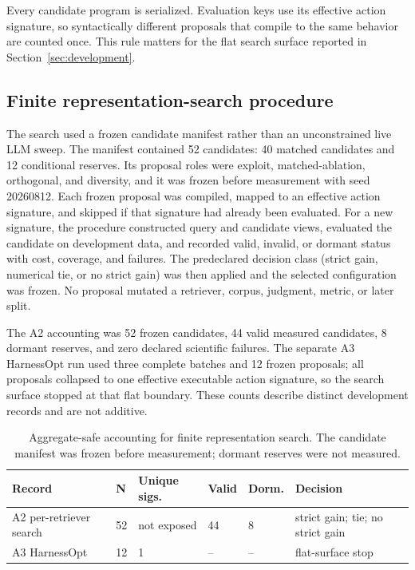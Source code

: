 \documentclass[final,5p,times,twocolumn]{elsarticle}
\newenvironment{widejournal}{\begin{table}[!t]}{\end{table}}
\newcommand{\journalTableFont}{\footnotesize}
\newenvironment{widejournal}{\begin{table}[!htbp]}{\end{table}}
\newcommand{\journalTableFont}{\footnotesize}
\begin{document}
Every candidate program is serialized. Evaluation keys use its effective
action signature, so syntactically different proposals that compile to the
same behavior are counted once. This rule matters for the flat search surface
reported in Section~\ref{sec:development}.

\subsection{Finite representation-search procedure}

The search used a frozen candidate manifest rather than an unconstrained live
LLM sweep. The manifest contained 52 candidates: 40 matched candidates and 12
conditional reserves. Its proposal roles were exploit, matched-ablation,
orthogonal, and diversity, and it was frozen before measurement with seed
20260812. Each frozen proposal was compiled, mapped to an effective action
signature, and skipped if that signature had already been evaluated. For a
new signature, the procedure constructed query and candidate views, evaluated
the candidate on development data, and recorded valid, invalid, or dormant
status with cost, coverage, and failures. The predeclared decision class
(strict gain, numerical tie, or no strict gain) was then applied and the
selected configuration was frozen. No proposal mutated a retriever, corpus,
judgment, metric, or later split.

The A2 accounting was 52 frozen candidates, 44 valid measured candidates, 8
dormant reserves, and zero declared scientific failures. The separate A3
HarnessOpt run used three complete batches and 12 frozen proposals; all
proposals collapsed to one effective executable action signature, so the
search surface stopped at that flat boundary. These counts describe distinct
development records and are not additive.

\begin{widejournal}
\caption{Aggregate-safe accounting for finite representation search. The
candidate manifest was frozen before measurement; dormant reserves were not
measured.}
\label{tab:search-accounting}
\centering
\journalTableFont
\scriptsize
\setlength{\tabcolsep}{2pt}
\sloppy
\begin{tabularx}{\textwidth}{@{}P{2.8cm}P{1.0cm}P{1.9cm}P{1.5cm}P{1.1cm}Y@{}}
\toprule
Record & N & Unique sigs. & Valid & Dorm. & Decision \\
\midrule
A2 per-retriever search & 52 & not exposed & 44 & 8 & strict gain; tie; no strict gain \\
A3 HarnessOpt & 12 & 1 & -- & -- & flat-surface stop \\
\bottomrule
\end{tabularx}
\end{widejournal}
\end{document}
